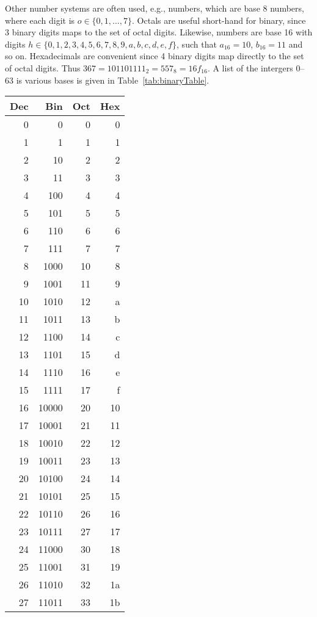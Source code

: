 Other number systems are often used, e.g.,  numbers, which are base 8 numbers, where each digit is $o\in\{0,1,\ldots,7\}$. Octals are useful short-hand for binary, since 3 binary digits maps to the set of octal digits. Likewise,  numbers are base 16 with digits $h\in\{0,1,2,3,4,5,6,7,8,9,a,b,c,d,e,f\}$, such that $a_{16}=10$, $b_{16}=11$ and so on. Hexadecimals are convenient since 4 binary digits map directly to the set of octal digits. Thus $367 = 101101111_2 = 557_8 = 16f_{16}$. A list of the intergers 0--63 is various bases is given in Table~\ref{tab:binaryTable}.
\begin{table}
  \centering
  \begin{tabular}{|r|r|r|r|}
    \hline
    Dec & Bin & Oct & Hex\\
    \hline
    0 & 0 & 0 & 0\\
    1 & 1 & 1 & 1\\
    2 & 10 & 2 & 2\\
    3 & 11 & 3 & 3 \\
    4 & 100 & 4 & 4\\
    5 & 101 & 5& 5\\
    6 & 110 & 6 & 6 \\
    7 & 111 & 7 & 7 \\
    8 & 1000 & 10 & 8\\
    9 & 1001 & 11 & 9\\
    10 & 1010 & 12 & a\\
    11 & 1011 & 13 & b\\
    12 & 1100 & 14 & c\\
    13 & 1101 & 15 & d\\
    14 & 1110 & 16 & e \\
    15 & 1111 & 17 & f\\
    16 & 10000 & 20 & 10\\
    17 & 10001 & 21 & 11\\
    18 & 10010 & 22 & 12\\
    19 & 10011 & 23 & 13 \\
    20 & 10100 & 24 & 14\\
    21 & 10101 & 25& 15\\
    22 & 10110 & 26 & 16 \\
    23 & 10111 & 27 & 17 \\
    24 & 11000 & 30 & 18\\
    25 & 11001 & 31 & 19\\
    26 & 11010 & 32 & 1a\\
    27 & 11011 & 33 & 1b\\

\end{tabular}
\end{table}
